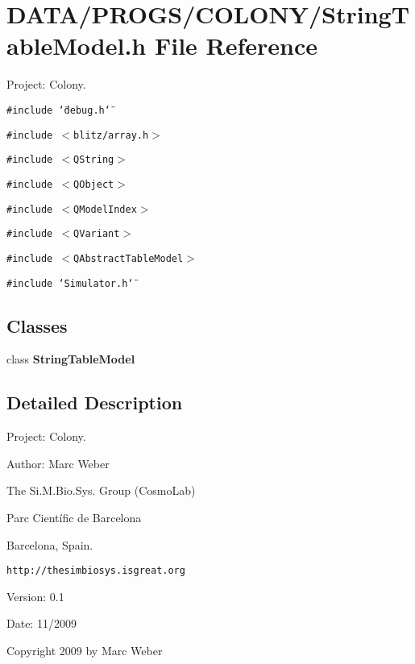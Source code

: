 \section{DATA/PROGS/COLONY/StringTableModel.h File Reference}
\label{StringTableModel_8h}
Project: Colony. 

{\tt \#include \char`\"{}debug.h\char`\"{}}\par
{\tt \#include $<$blitz/array.h$>$}\par
{\tt \#include $<$QString$>$}\par
{\tt \#include $<$QObject$>$}\par
{\tt \#include $<$QModelIndex$>$}\par
{\tt \#include $<$QVariant$>$}\par
{\tt \#include $<$QAbstractTableModel$>$}\par
{\tt \#include \char`\"{}Simulator.h\char`\"{}}\par
\subsection*{Classes}
\begin{CompactItemize}
\item 
class {\bf StringTableModel}
\end{CompactItemize}


\subsection{Detailed Description}
Project: Colony. 

\begin{Desc}
\item[Author:]Marc Weber\par
 The Si.M.Bio.Sys. Group (CosmoLab)\par
 Parc Científic de Barcelona\par
 Barcelona, Spain.\par
 {\tt http://thesimbiosys.isgreat.org} \end{Desc}
\begin{Desc}
\item[Version:]0.1 \end{Desc}
\begin{Desc}
\item[Date:]11/2009\end{Desc}
Copyright 2009 by Marc Weber 